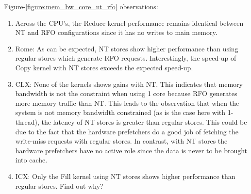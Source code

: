 \documentclass{article}
\begin{document}
Figure-\ref{figure:mem_bw_core_nt_rfo} observations:
\begin{enumerate}
\item Across the CPU's, the Reduce kernel performance remains identical between NT and RFO configurations since it has no writes to main memory.
\item Rome: As can be expected, NT stores show higher performance than using regular stores which generate RFO requests. Interestingly, the speed-up of Copy kernel with NT stores exceeds the expected speed-up.
\item CLX: None of the kernels shows gains with NT. This indicates that memory bandwidth is not the constraint when using 1 core because RFO generates more memory traffic than NT. This leads to the observation that when the system is not memory bandwidth constrained (as is the case here with 1-thread), the latency of NT stores is greater than regular stores. This could be due to the fact that the hardware prefetchers do a good job of fetching the write-miss requests with regular stores. In contrast, with NT stores the hardware prefetchers have no active role since the data is never to be brought into cache.
\item ICX: Only the Fill kernel using NT stores shows higher performance than regular stores. Find out why?
\end{enumerate}
\end{document}
